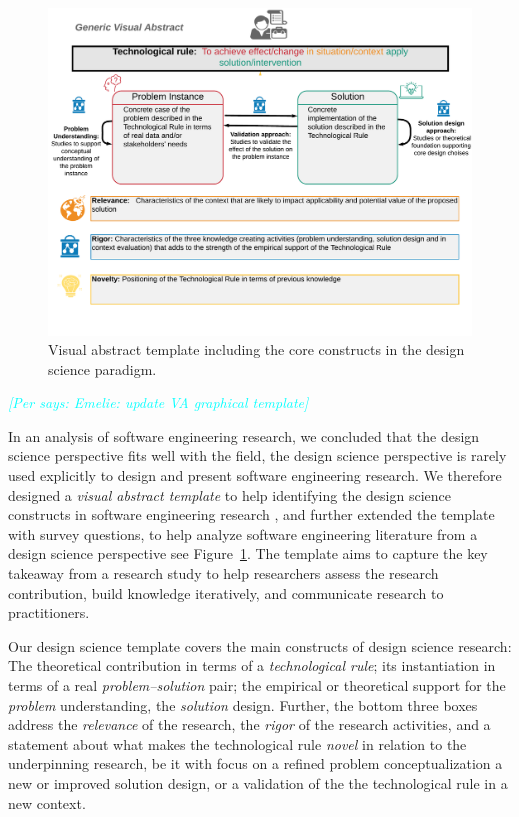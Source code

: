 \documentclass[graybox]{svmult}
\newcommand{\per}[1]{\textcolor{cyan}{{\it [Per says: #1]}}}
\newcommand{\per}[1]{}
\begin{document}

\begin{figure}[t]
  \includegraphics[width=1.0\textwidth]{Figures/GenericVA.png}
\caption{Visual abstract template including the core constructs in the design science paradigm.}
\label{fig:VA-template}       %
\end{figure}


\per{Emelie: update VA graphical template}

In an analysis of software engineering research, we concluded that the design science perspective fits well with the field, the design science perspective is rarely used explicitly to design and present software engineering research. We therefore designed a \emph{visual abstract template} to help identifying the design science constructs in software engineering research \cite{StoreyESEM17}, and further extended the template with survey questions, to help analyze software engineering literature from a design science perspective \cite{Engstrom19arxiv} see Figure~\ref{fig:VA-template}. The template aims to capture the key takeaway from a research study to help researchers assess the research contribution, build knowledge iteratively, and communicate research to practitioners. %

Our design science template covers the main constructs of design science research: The theoretical contribution in terms of a \emph{technological rule}; its instantiation in terms of a real \emph{problem--solution} pair;  the empirical or theoretical support for the \emph{problem} understanding, the \emph{solution} design. Further, the bottom three boxes address the \emph{relevance} of the research, the \emph{rigor} of the research activities,  and a statement about what makes the technological rule \emph{novel} in relation to the underpinning research, be it with focus on a refined problem conceptualization a new or improved solution design, or a validation of the the technological rule in a new context. 
\end{document}
